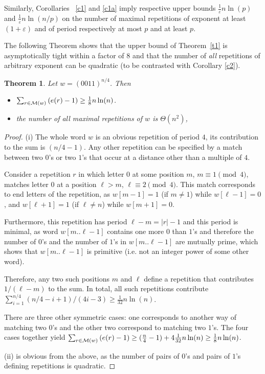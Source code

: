 \documentclass[11pt]{article}
\newtheorem{theorem}{Theorem}
\def\paren#1{\left( #1 \right)}
\newcommand{\mr}[1]{{\cal M}({#1})}
\begin{document}
Similarly,
Corollaries ~\ref{c1} and \ref{c1a}
imply respective upper bounds $\frac{1}{\varepsilon}{n\ln(p)}$ and
$\frac{1}{\varepsilon}{n\ln(n/p)}$ on the 
number of maximal repetitions of exponent at least $(1+\varepsilon)$
and of period respectively at most $p$ and at least $p$. 

The following Theorem shows that the upper bound of Theorem~\ref{t1}
is asymptotically tight within a factor of 8 and that the number of
{\em all} repetitions of arbitrary exponent can be quadratic (to be
contrasted with Corollary \ref{c2}). 

\begin{theorem}
\label{t2}
Let $w=(0011)^{n/4}$. Then \begin{itemize}
\item[(i)] $\sum_{r\in \mr{w}}\paren{e(r)-1}\ge\frac{1}{8}n\ln(n)$.
\item[(ii)] the number of all maximal repetitions of $w$ is $\Theta(n^2)$,
\end{itemize}
\end{theorem}

\begin{proof}
(i) The whole word $w$ is an obvious repetition of period $4$, its contribution to
the sum 
is $(n/4-1)$. Any other repetition can be specified by a
match between two $0$'s or two $1$'s that occur at a distance other
than a multiple of $4$. 

Consider a repetition $r$ in which letter $0$ at some position $m$,
$m\equiv 1\pmod{4}$, 
matches letter $0$ at a position $\ell>m$, $\ell\equiv
2\pmod{4}$. This match corresponds to end letters of the repetition,
as $w[m-1]=1$ (if $m\neq 1$) while $w[\ell-1]=0$, and $w[\ell+1]=1$
(if $\ell\neq n$) while $w[m+1]=0$. 

Furthermore, this repetition has period $\ell-m=|r|-1$ and this period
is minimal, as word $w[m..\ell-1]$ contains one more $0$ than $1$'s
and therefore the number of $0$'s and the number of $1$'s in $w[m..\ell-1]$ are
mutually prime, which shows that $w[m..\ell-1]$ is primitive (i.e. not
an integer power of some other word). 

Therefore, any two such positions $m$ and $\ell$ define a repetition that contributes
$1/(\ell-m)$ to the sum. 
In total, all such repetitions contribute $\sum_{i=1}^{n/4} (n/4-i+1)/(4i-3) \geq \frac{1}{32}n\ln(n)$.

There are three other symmetric cases: one corresponds to another way
of matching two $0$'s and the other two correspond to matching two $1$'s. 
The four cases together yield
$\sum_{r\in \mr{w}}\paren{e(r)-1}\ge (\frac{n}{4}-1)+
4\frac{1}{32}n\ln(n)\geq \frac{1}{8}n\ln(n)$. 

(ii) is obvious from the above, as the number of pairs of $0$'s and
pairs of $1$'s defining repetitions is quadratic. 
\end{proof}
\end{document}
